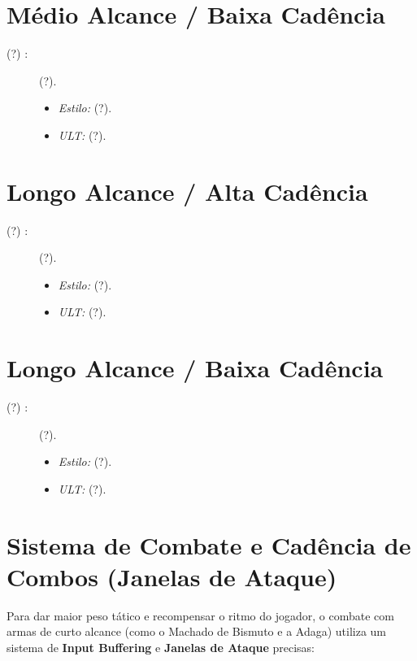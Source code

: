 \documentclass[a4paper,12pt]{report}
\begin{document}
\section{Médio Alcance / Baixa Cadência}
\begin{description}
    \item[(?) :] (?).
    \begin{itemize}
        \item \textit{Estilo:} (?).
        \item \textit{ULT:} (?).
    \end{itemize}
\end{description}

\section{Longo Alcance / Alta Cadência}
\begin{description}
    \item[(?) :] (?).
    \begin{itemize}
        \item \textit{Estilo:} (?).
        \item \textit{ULT:} (?).
    \end{itemize}
\end{description}

\section{Longo Alcance / Baixa Cadência}
\begin{description}
    \item[(?) :] (?).
    \begin{itemize}
        \item \textit{Estilo:} (?).
        \item \textit{ULT:} (?).
    \end{itemize}
\end{description}

\section{Sistema de Combate e Cadência de Combos (Janelas de Ataque)}
Para dar maior peso tático e recompensar o ritmo do jogador, o combate com armas de curto alcance (como o Machado de Bismuto e a Adaga) utiliza um sistema de \textbf{Input Buffering} e \textbf{Janelas de Ataque} precisas:
\end{document}
